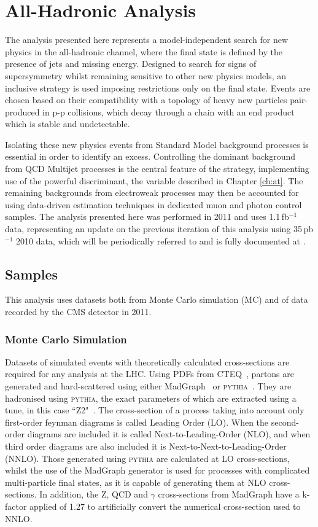 \chapter{All-Hadronic Analysis}
\label{ch:ra1}
The analysis presented here represents a model-independent search for new physics in the all-hadronic channel, where the final state is defined by the presence of jets and missing energy. Designed to search for signs of supersymmetry whilst remaining sensitive to other new physics models, an inclusive strategy is used imposing restrictions only on the final state. Events are chosen based on their compatibility with a topology of heavy new particles pair-produced in p-p collisions, which decay through a chain with an end product which is stable and undetectable.

Isolating these new physics events from Standard Model background processes is essential in order to identify an excess. Controlling the dominant background from QCD Multijet processes is the central feature of the strategy, implementing use of the powerful discriminant, the \alt variable described in Chapter \ref{ch:at}. The remaining backgrounds from electroweak processes may then be accounted for using data-driven estimation techniques in dedicated muon and photon control samples. The analysis presented here was performed in 2011 and uses 1.1\,fb$^{-1}$ data, representing an update on the previous iteration of this analysis using 35\,pb$^{-1}$ 2010 data, which will be periodically referred to and is fully documented at \cite{35paper}.



\section{Samples}
This analysis uses datasets both from Monte Carlo simulation (MC) and of data recorded by the CMS detector in 2011.

\subsection{Monte Carlo Simulation}
Datasets of simulated events with theoretically calculated cross-sections are required for any analysis at the LHC. Using PDFs from CTEQ~\cite{CTEQ}, partons are generated and hard-scattered using either MadGraph~\cite{madgraph} or \textsc{pythia}~\cite{pythia}. They are hadronised using \textsc{pythia}, the exact parameters of which are extracted using a tune, in this case ``Z2"~\cite{tuneZ2}.
The cross-section of a process taking into account only first-order feynman diagrams is called Leading Order (LO). When the second-order diagrams are included it is called Next-to-Leading-Order (NLO), and when third order diagrams are also included it is Next-to-Next-to-Leading-Order (NNLO).   Those generated using \textsc{pythia} are calculated at LO cross-sections, whilst the use of the MadGraph generator is used for processes with complicated multi-particle final states, as it is capable of generating them at NLO cross-sections. In addition, the Z, QCD and $\gamma$ cross-sections from MadGraph have a k-factor applied of 1.27 to artificially convert the numerical cross-section used to NNLO.

